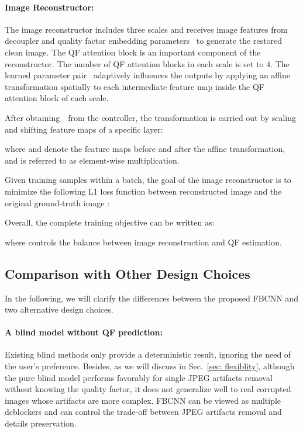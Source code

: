 \documentclass[10pt,twocolumn,letterpaper]{article}
\begin{document}
\paragraph{Image Reconstructor:} The image reconstructor includes three scales and receives image features from decoupler and quality factor embedding parameters~ to generate the restored clean image. The QF attention block is an important component of the reconstructor. The number of QF attention blocks in each scale is set to 4. The learned parameter pair~ adaptively influences the outputs by applying an affine transformation spatially to each intermediate feature map inside the QF attention block of each scale.


After obtaining~~from the controller, the transformation is carried out by scaling and shifting feature maps of a specific layer:

where  and  denote the feature maps before and after the affine transformation, and  is referred to as element-wise multiplication. 


Given  training samples within a batch, the goal of the image reconstructor is to minimize the following L1 loss function between reconstructed image  and the original ground-truth image :

Overall, the complete training objective can be written as:

where  controls the balance between image reconstruction and QF estimation.



\subsection{Comparison with Other Design Choices}
In the following, we will clarify the differences between the proposed FBCNN and two alternative design choices.


\paragraph{A blind model without QF prediction:} Existing blind methods only provide a deterministic result, ignoring the need of the user's preference. Besides, as we will discuss in Sec.~\ref{sec: flexiblity}, although the pure blind model performs favorably for single JPEG artifacts removal without knowing the quality factor, it does not generalize well to real corrupted images whose artifacts are more complex. FBCNN can be viewed as multiple deblockers and can control the trade-off between JPEG artifacts removal and details preservation.
\end{document}

